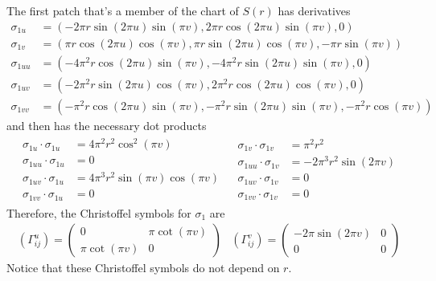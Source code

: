 \documentclass{article}
\begin{document}
		The first patch that's a member of the chart of $S(r)$ has derivatives
		\begin{equation*} \begin{split}
			\sigma_{1u} & = ( -2\pi r \sin(2\pi u)\sin(\pi v) , 2\pi r \cos(2\pi u)\sin(\pi v) , 0 ) \\
			\sigma_{1v} & = ( \pi r \cos(2\pi u)\cos(\pi v) , \pi r \sin(2\pi u)\cos(\pi v) , -\pi r \sin(\pi v) ) \\
			\sigma_{1uu} & = ( -4\pi^2 r \cos(2\pi u)\sin(\pi v) , -4\pi^2 r \sin(2\pi u)\sin(\pi v) , 0 ) \\
			\sigma_{1uv} & = ( -2\pi^2 r \sin(2\pi u)\cos(\pi v) , 2\pi^2 r \cos(2\pi u)\cos(\pi v) , 0 ) \\
			\sigma_{1vv} & = ( -\pi^2 r \cos(2\pi u)\sin(\pi v) , -\pi^2 r \sin(2\pi u)\sin(\pi v) , -\pi^2 r \cos(\pi v) )
		\end{split} \end{equation*}
		and then has the necessary dot products
		\begin{equation*} \begin{array}{ll}
			\begin{split}
				\sigma_{1u} \cdot \sigma_{1u} & = 4\pi^2r^2\cos^2(\pi v) \\
				\sigma_{1uu} \cdot \sigma_{1u} & = 0 \\
				\sigma_{1uv} \cdot \sigma_{1u} & = 4\pi^3r^2\sin(\pi v)\cos(\pi v) \\
				\sigma_{1vv} \cdot \sigma_{1u} & = 0
			\end{split} & \begin{split}
				\sigma_{1v} \cdot \sigma_{1v} & = \pi^2r^2 \\
				\sigma_{1uu} \cdot \sigma_{1v} & = -2\pi^3r^2\sin(2\pi v) \\
				\sigma_{1uv} \cdot \sigma_{1v} & = 0 \\
				\sigma_{1vv} \cdot \sigma_{1v} & = 0
			\end{split}
		\end{array} \end{equation*}
		Therefore, the Christoffel symbols for $\sigma_1$ are
		\begin{equation}
			\begin{array}{lr}
			\left(\Gamma^{u}_{ij}\right) = \left( \begin{array}{cc}
					0 & \pi\cot(\pi v) \\
					\pi\cot(\pi v) & 0
				\end{array} \right) &
			\left(\Gamma^{v}_{ij}\right) = \left( \begin{array}{cc}
					-2\pi\sin(2\pi v) & 0 \\
					0 & 0
				\end{array} \right)
			\end{array}
		\end{equation}
		Notice that these Christoffel symbols do not depend on $r$.
		
\end{document}
